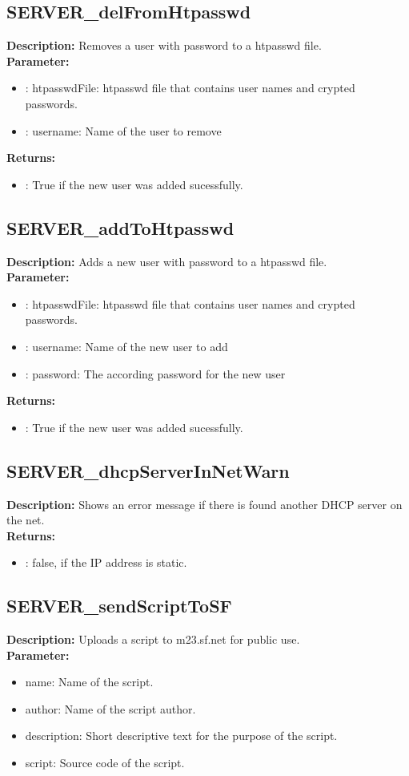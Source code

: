 \subsection{SERVER\_delFromHtpasswd}
\textbf{Description:} Removes a user with password to a htpasswd file.\\
\textbf{Parameter:}
\begin{itemize}
\item : htpasswdFile: htpasswd file that contains user names and crypted passwords.
\item : username: Name of the user to remove
\end{itemize}
\textbf{Returns:}
\begin{itemize}
\item : True if the new user was added sucessfully.
\end{itemize}

\subsection{SERVER\_addToHtpasswd}
\textbf{Description:} Adds a new user with password to a htpasswd file.\\
\textbf{Parameter:}
\begin{itemize}
\item : htpasswdFile: htpasswd file that contains user names and crypted passwords.
\item : username: Name of the new user to add
\item : password: The according password for the new user
\end{itemize}
\textbf{Returns:}
\begin{itemize}
\item : True if the new user was added sucessfully.
\end{itemize}

\subsection{SERVER\_dhcpServerInNetWarn}
\textbf{Description:} Shows an error message if there is found another DHCP server on the net.\\
\textbf{Returns:}
\begin{itemize}
\item : false, if the IP address is static.
\end{itemize}

\subsection{SERVER\_sendScriptToSF}
\textbf{Description:} Uploads a script to m23.sf.net for public use.\\
\textbf{Parameter:}
\begin{itemize}
\item name: Name of the script.
\item author: Name of the script author.
\item description: Short descriptive text for the purpose of the script.
\item script: Source code of the script.
\end{itemize}


